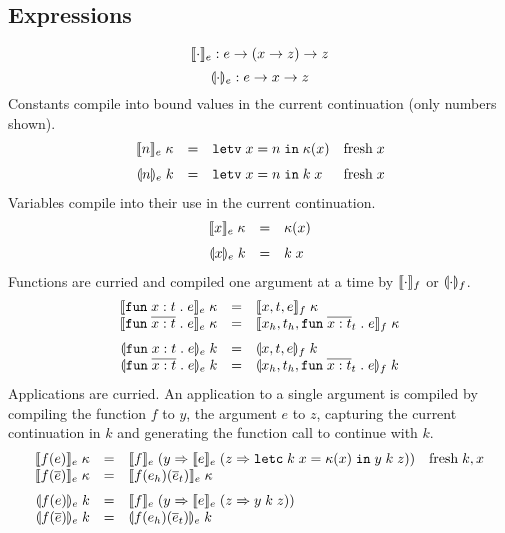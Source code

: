 \documentclass[11pt]{article}
\begin{document}
\subsection*{Expressions}

\[
    \llbracket \cdot \rrbracket_e : e -> (x -> z) -> z
\]
\[
    \llparenthesis \cdot \rrparenthesis_e : e -> x -> z
\]
Constants compile into bound values in the current continuation (only numbers shown).
\[
\begin{array}{rcll}
\cmpk{e}{\nume{n}} & = &
  \letv{x}{n}{\kappa(x)}   & \fresh{x} \medskip \\

\tcmpk{e}{\nume{n}} & = &
  \letv{x}{n}{\appc{k}{x}} & \fresh{x} \\
\end{array}
\]
Variables compile into their use in the current continuation.
\[
\begin{array}{rcll}
\cmpk{e}{\vare{x}} & = &
  \kappa(x) \medskip \\

\tcmpk{e}{\vare{x}} & = &
  \appc{k}{x} \\
\end{array}
\]
Functions are curried and compiled one argument at a time by $\llbracket \cdot \rrbracket_f$ or $\llparenthesis \cdot \rrparenthesis_f$.
\[
\begin{array}{rcll}
\cmpk{e}{\fune{\arge{x}{t}}{e}} & = &
  \cmpk{f}{x,t,e}
  \\
\cmpk{e}{\fune{\rep{\arge{x}{t}}}{e}} & = &
  \cmpk{f}{x_h,t_h,\fune{\rep{\arge{x}{t}}_t}{e}} \medskip \\

\tcmpk{e}{\fune{\arge{x}{t}}{e}} & = &
  \tcmpk{f}{x,t,e}
  \\
\tcmpk{e}{\fune{\rep{\arge{x}{t}}}{e}} & = &
  \tcmpk{f}{x_h,t_h,\fune{\rep{\arge{x}{t}}_t}{e}}
\end{array}
\]
Applications are curried.
An application to a single argument is compiled by compiling the function $f$ to $y$, the argument $e$ to $z$, capturing the current continuation in $k$ and generating the function call to continue with $k$.
\[
\begin{array}{rcll}
\cmpk{e}{\appe{f}{e}} & = &
  \cmpin{e}{f}{(y => \cmpin{e}{e}{(z => \letc{k}{x}{\kappa(x)}{\appf{y}{k}{z}})})} &
  \fresh{k,x} \\
\cmpk{e}{\appe{f}{\rep{e}}} & = &
  \cmpk{e}{\appe{\appe{f}{e_h}}{\rep{e}_t}} \medskip \\

\tcmpk{e}{\appe{f}{e}} & = &
  \cmpin{e}{f}{(y => \cmpin{e}{e}{(z => \appf{y}{k}{z})})} \\
\tcmpk{e}{\appe{f}{\rep{e}}} & = &
  \tcmpk{e}{\appe{\appe{f}{e_h}}{\rep{e}_t}} \\
\end{array}
\]
\end{document}
